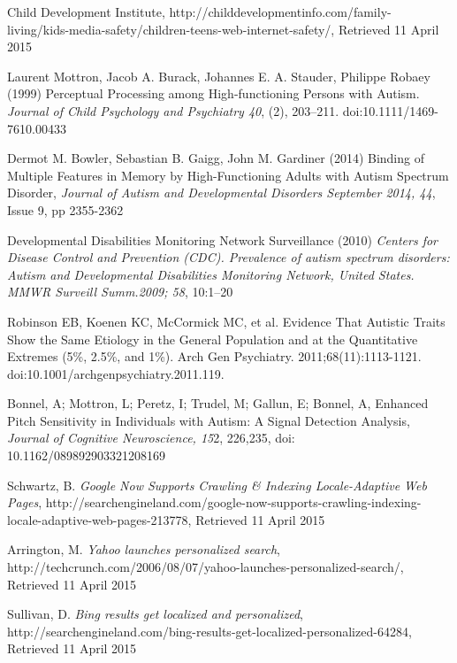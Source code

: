 \documentclass[a4paper, 10pt]{article}
\begin{document}
\clearpage
\begin{thebibliography}{100}

 Child Development Institute, http://childdevelopmentinfo.com/family-living/kids-media-safety/children-teens-web-internet-safety/, Retrieved 11 April 2015

 Laurent Mottron, Jacob A. Burack, Johannes E. A. Stauder, Philippe Robaey (1999) Perceptual Processing among High-functioning Persons with Autism. \textit{Journal of Child Psychology and Psychiatry 40}, (2), 203–211. doi:10.1111/1469-7610.00433

Dermot M. Bowler, Sebastian B. Gaigg, John M. Gardiner (2014) Binding of Multiple Features in Memory by High-Functioning Adults with Autism Spectrum Disorder, \textit{Journal of Autism and Developmental Disorders September 2014, 44}, Issue 9, pp 2355-2362

Developmental Disabilities Monitoring Network Surveillance (2010) \textit{Centers for Disease Control and Prevention (CDC). Prevalence of autism spectrum disorders: Autism and Developmental Disabilities Monitoring Network, United States. MMWR Surveill Summ.2009; 58}, 10:1–20

 Robinson EB, Koenen KC, McCormick MC, et al. Evidence That Autistic Traits Show the Same Etiology in the General Population and at the Quantitative Extremes (5\%, 2.5\%, and 1\%). Arch Gen Psychiatry. 2011;68(11):1113-1121. doi:10.1001/archgenpsychiatry.2011.119.

 Bonnel, A; Mottron, L; Peretz, I; Trudel, M; Gallun, E; Bonnel, A, Enhanced Pitch Sensitivity in Individuals with Autism: A Signal Detection Analysis, \textit{Journal of Cognitive Neuroscience, 15}2, 226,235, doi: 10.1162/089892903321208169

Schwartz, B. \textit{Google Now Supports Crawling \& Indexing Locale-Adaptive Web Pages}, http://searchengineland.com/google-now-supports-crawling-indexing-locale-adaptive-web-pages-213778, Retrieved 11 April 2015

Arrington, M. \textit{Yahoo launches personalized search}, http://techcrunch.com/2006/08/07/yahoo-launches-personalized-search/, Retrieved 11 April 2015

Sullivan, D. \textit{Bing results get localized and personalized}, http://searchengineland.com/bing-results-get-localized-personalized-64284, Retrieved 11 April 2015


\end{thebibliography}
\end{document}
